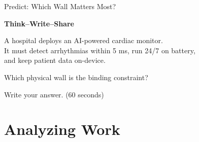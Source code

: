 \documentclass[aspectratio=169, 12pt]{beamer}
\begin{document}
\begin{frame}{Predict: Which Wall Matters Most?}
\note{
%
%
%
%
%
}

\centering
\vspace{0.8cm}
{\Large\bfseries Think--Write--Share}

\vspace{0.5cm}
{\large A hospital deploys an AI-powered cardiac monitor.\\
It must detect arrhythmias within 5 ms, run 24/7 on battery,\\
and keep patient data on-device.}

\vspace{0.4cm}
{\normalsize Which physical wall is the \alert{binding constraint}?}

\vspace{0.4cm}
{\small\textcolor{midgray}{Write your answer. (60 seconds)}}

\end{frame}

\section{Analyzing Work}
\end{document}
